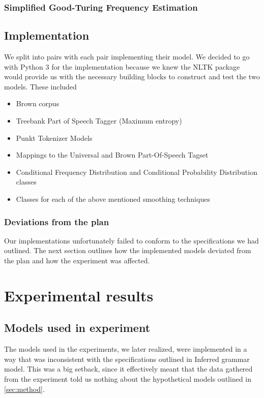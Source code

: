 \documentclass[a4paper,12pt]{article}
\begin{document}
\subsubsection{Simplified Good-Turing Frequency Estimation}


\subsection{Implementation}
\label{sec:impl}

We split into pairs with each pair implementing their model. We decided to go with Python 3 for the implementation because we knew the NLTK package would provide us with the necessary building blocks to construct and test the two models. These included
\begin{itemize}
\item Brown corpus
\item Treebank Part of Speech Tagger (Maximum entropy)
\item Punkt Tokenizer Models
\item Mappings to the Universal and Brown Part-Of-Speech Tagset
\item Conditional Frequency Distribution and Conditional Probability Distribution classes
\item Classes for each of the above mentioned smoothing techniques
\end{itemize}

\subsubsection{Deviations from the plan}
Our implementations unfortunately failed to conform to the specifications we had outlined. The next section outlines how the implemented models deviated from the plan and how the experiment was affected.


\section{Experimental results}
\label{sec:exps}

\subsection{Models used in experiment}
The models used in the experiments, we later realized, were implemented in a way that was inconsistent with the specifications outlined in {Inferred grammar model}. This was a big setback, since it effectively meant that the data gathered from the experiment told us nothing about the hypothetical models outlined in \ref{sec:method}.
\end{document}
